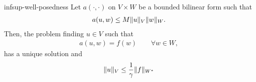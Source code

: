 \begin{Theorem}{infsup-well-posedness}
  Let $a(\cdot,\cdot)$ on $V\times W$ be a bounded bilinear form such that
  \begin{gather}
    a(u,w) \le M \lVert u\rVert_V \lVert w\rVert_W.
  \end{gather}
  Then, the problem finding $u\in V$ such that
  \begin{gather}
    a(u,w) = f(w) \qquad\forall w\in W,
  \end{gather}
  has a unique solution and
  \begin{gather}
    \lVert u\rVert_V \le \frac1\gamma \lVert f\rVert_{W^*}
  \end{gather}
\end{Theorem}
